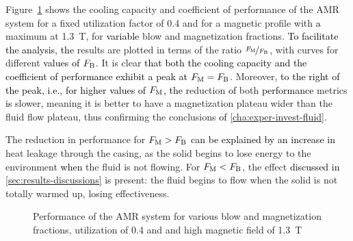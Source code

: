 \documentclass[referee]{svjour3}
\begin{document}
Figure~\ref{fig:Qc_COP_curves_phi40} shows the cooling capacity and coefficient of performance of the AMR system for a fixed utilization factor of \num{0.4} and for a magnetic profile with \textcolor{black}{a} maximum at \SI{1.3}{\tesla}, for \textcolor{black}{variable} blow and magnetization fractions. \textcolor{black}{To facilitate the analysis, the} results are plotted in terms of the ratio $\nicefrac{F_{\mathrm{M}}}{F_{\mathrm{B}}}$, with curves for different \textcolor{black}{values of} $F_{\mathrm{B}}$. It is clear \textcolor{black}{that both the cooling capacity and the coefficient of performance exhibit a peak at} $F_{\mathrm{M}} = F_{\mathrm{B}}$. Moreover,  \textcolor{black}{to the right of the peak, i.e., for higher values of $F_{\mathrm{M}}$, the}  reduction \textcolor{black}{of} both \textcolor{black}{performance} metrics \textcolor{black}{is} slower, meaning it is better to have a magnetization plateau wider than the fluid flow plateau, thus confirming the conclusions \textcolor{black}{of} \autoref{cha:exper-invest-fluid}. 

The reduction in performance for $F_{\mathrm{M}} > F_{\mathrm{B}}$ \textcolor{black}{can be explained by an increase in} heat leakage through the casing, as the solid begins to lose energy to the environment \textcolor{black}{when} the fluid is not flowing. For $F_{\mathrm{M}} < F_{\mathrm{B}}$, the effect \textcolor{black}{discussed in} \autoref{sec:results-discussions} is present: the fluid begins to flow when the solid is not totally warmed up, losing effectiveness.

\begin{figure}[!ht]
  \centering
\quad
  \caption{Performance of the AMR system for various blow and magnetization fractions, utilization of 0.4 and and high magnetic field of \SI{1.3}{\tesla}}
  \label{fig:Qc_COP_curves_phi40}
\end{figure}
\end{document}
